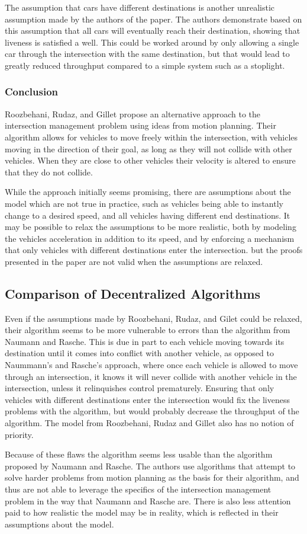 \documentclass[12pt]{article}
\begin{document}
The assumption that cars have different destinations is another unrealistic assumption made by the authors of the paper. The authors demonstrate based on this assumption that all cars will eventually reach their destination, showing that liveness is satisfied a well. This could be worked around by only allowing a single car through the intersection with the same destination, but that would lead to greatly reduced throughput compared to a simple system such as a stoplight.
\subsubsection{Conclusion}
Roozbehani, Rudaz, and Gillet propose an alternative approach to the intersection management problem using ideas from motion planning. Their algorithm allows for vehicles to move freely within the intersection, with vehicles moving in the direction of their goal, as long as they will not collide with other vehicles. When they are close to other vehicles their velocity is altered to ensure that they do not collide.\par
While the approach initially seems promising, there are assumptions about the model which are not true in practice, such as vehicles being able to instantly change to a desired speed, and all vehicles having different end destinations. It may be possible to relax the assumptions to be more realistic, both by modeling the vehicles acceleration in addition to its speed, and by enforcing a mechanism that only vehicles with different destinations enter the intersection. but the proofs presented in the paper are not valid when the assumptions are relaxed.\par
\subsection{Comparison of Decentralized Algorithms}
Even if the assumptions made by Roozbehani, Rudaz, and Gilet could be relaxed, their algorithm seems to be more vulnerable to errors than the algorithm from Naumann and Rasche. This is due in part to each vehicle moving towards its destination until it comes into conflict with another vehicle, as opposed to Naummann's and Rasche's approach, where once each vehicle is allowed to move through an intersection, it knows it will never collide with another vehicle in the intersection, unless it relinquishes control prematurely. Ensuring that only vehicles with different destinations enter the intersection would fix the liveness problems with the algorithm, but would probably decrease the throughput of the algorithm. The model from Roozbehani, Rudaz and Gillet also has no notion of priority.\par
Because of these flaws the algorithm seems less usable than the algorithm proposed by Naumann and Rasche. The authors use algorithms that attempt to solve harder problems from motion planning as the basis for their algorithm, and thus are not able to leverage the specifics of the intersection management problem in the way that Naumann and Rasche are. There is also less attention paid to how realistic the model may be in reality, which is reflected in their assumptions about the model.
\end{document}
